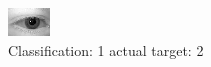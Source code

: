\begin{figure}[h!]
\begin{center}
\includegraphics[width=0.60\columnwidth]{figures/ID376_class_1_target_2.png}
\end{center}
\caption{ Classification: 1 actual target: 2}
\label{fig:ID376_class_1_target_2}
\end{figure}
